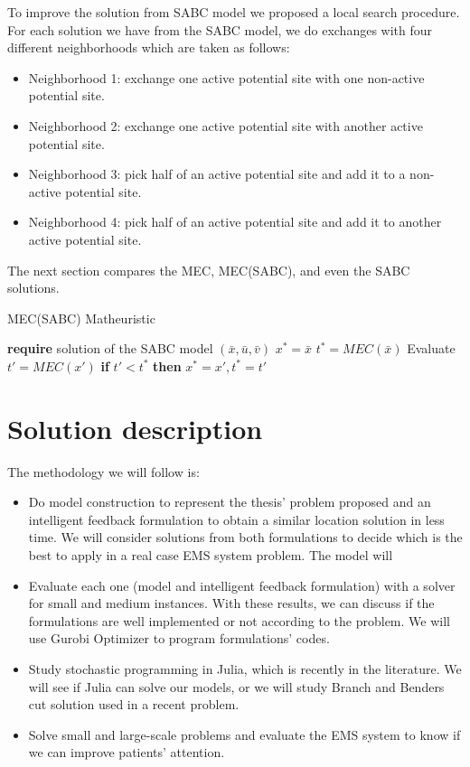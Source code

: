 To improve the solution from SABC model we proposed a local search procedure. For each solution we have from the SABC model, we do exchanges with four different neighborhoods which are taken as follows:
\begin{itemize}
 \item Neighborhood 1: exchange one active potential site with one non-active potential site.
\item Neighborhood 2: exchange one active potential site with another active potential site.
\item Neighborhood 3: pick half of an active potential site and add it to a non-active potential site.
\item Neighborhood 4: pick half of an active potential site and add it to another active potential site.
\end{itemize}


The next section compares the MEC, MEC(SABC), and even the SABC solutions.  



\begin{algorithm}
\caption{MEC(SABC) Matheuristic}\label{alg:cap_1}
\begin{algorithmic}[1]
\State \textbf{require} solution of the SABC model $(\bar{x},\bar{u},\bar{v})$
\State $x^* = \bar{x}$
\State $t^* = MEC(\bar{x})$
			\State Evaluate $t'=MEC(x')$ 
    		\State \textbf{if } $t' < t^*$ \textbf{then}  $x^* = x', t^*=t'$ 
    	\EndFor 
    \EndFor
\EndWhile
{}
\end{algorithmic}
\end{algorithm}


\chapter{Solution description}

The methodology we will follow is:
\begin{itemize}
\item Do model construction to represent the thesis' problem proposed and an intelligent feedback formulation to obtain a similar location solution in less time. We will consider solutions from both formulations to decide which is the best to apply in a real case EMS system problem. The model will 
\item Evaluate each one (model and intelligent feedback formulation) with a solver for small and medium instances. With these results, we can discuss if the formulations are well implemented or not according to the problem. We will use Gurobi Optimizer to program formulations' codes.
\item Study stochastic programming in Julia, which is recently in the literature. We will see if Julia can solve our models, or we will study Branch and Benders cut solution used in a recent problem.
\item Solve small and large-scale problems and evaluate the EMS system to know if we can improve patients' attention.
\end{itemize}

